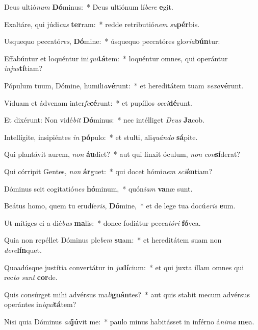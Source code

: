 \item Deus ultió\textit{num} \textbf{Dó}minus:~* Deus ultiónum lí\textit{be}\textit{re} \textbf{e}git.
\item Exaltáre, qui júdi\textit{cas} \textbf{ter}ram:~* redde retributió\textit{nem} \textit{su}\textbf{pér}bis.
\item Usquequo peccató\textit{res}, \textbf{Dó}mine:~* úsquequo peccatóres glo\textit{ri}\textit{a}\textbf{bún}tur:
\item Effabúntur et loquéntur ini\textit{qui}\textbf{tá}tem:~* loquéntur omnes, qui operántur \textit{in}\textit{jus}\textbf{tí}tiam?
\item Pópulum tuum, Dómine, humili\textit{a}\textbf{vé}runt:~* et hereditátem tuam \textit{ve}\textit{xa}\textbf{vé}runt.
\item Víduam et ádvenam inter\textit{fe}\textbf{cé}runt:~* et pupíllos \textit{oc}\textit{ci}\textbf{dé}runt.
\item Et dixérunt: Non vidé\textit{bit} \textbf{Dó}minus:~* nec intélliget \textit{De}\textit{us} \textbf{Ja}cob.
\item Intellígite, insipiéntes \textit{in} \textbf{pó}pulo:~* et stulti, ali\textit{quán}\textit{do} \textbf{sá}pite.
\item Qui plantávit aurem, \textit{non} \textbf{áu}diet?~* aut qui finxit óculum, \textit{non} \textit{con}\textbf{sí}derat?
\item Qui córripit Gentes, \textit{non} \textbf{ár}guet:~* qui docet hómi\textit{nem} \textit{sci}\textbf{én}tiam?
\item Dóminus scit cogitatió\textit{nes} \textbf{hó}minum,~* quón\textit{i}\textit{am} \textbf{va}næ sunt.
\item Beátus homo, quem tu erudíe\textit{ris}, \textbf{Dó}mine,~* et de lege tua docú\textit{e}\textit{ris} \textbf{e}um.
\item Ut mítiges ei a dié\textit{bus} \textbf{ma}lis:~* donec fodiátur pecca\textit{tó}\textit{ri} \textbf{fó}vea.
\item Quia non repéllet Dóminus ple\textit{bem} \textbf{su}am:~* et hereditátem suam non \textit{de}\textit{re}\textbf{lín}quet.
\item Quoadúsque justítia convertátur in \textit{ju}\textbf{dí}cium:~* et qui juxta illam omnes qui rec\textit{to} \textit{sunt} \textbf{cor}de.
\item Quis consúrget mihi advérsus ma\textit{li}\textbf{gnán}tes?~* aut quis stabit mecum advérsus operántes in\textit{i}\textit{qui}\textbf{tá}tem?
\item Nisi quia Dóminus \textit{ad}\textbf{jú}vit me:~* paulo minus habitásset in inférno á\textit{ni}\textit{ma} \textbf{me}a.
